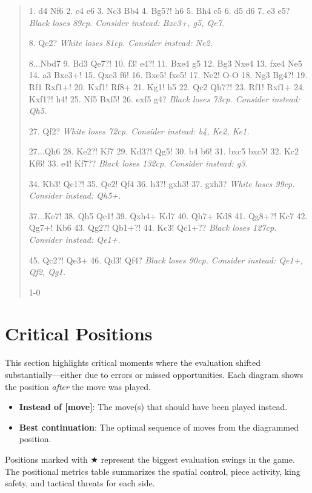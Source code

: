 \documentclass[11pt]{book}
\begin{document}
\begin{quote}
1. d4 Nf6
2. c4 e6
3. Nc3 Bb4
4. Bg5?! h6
5. Bh4 c5
6. d5 d6
7. e3 e5?
\textit{Black loses 89cp. Consider instead: Bxc3+, g5, Qe7.}

8. Qc2?
\textit{White loses 81cp. Consider instead: Ne2.}

8...Nbd7
9. Bd3 Qe7?!
10. f3! e4?!
11. Bxe4 g5
12. Bg3 Nxe4
13. fxe4 Ne5
14. a3 Bxc3+!
15. Qxc3 f6!
16. Bxe5! fxe5!
17. Ne2! O-O
18. Ng3 Bg4?!
19. Rf1 Rxf1+!
20. Kxf1! Rf8+
21. Kg1! h5
22. Qc2 Qh7?!
23. Rf1! Rxf1+
24. Kxf1?! h4!
25. Nf5 Bxf5!
26. exf5 g4?
\textit{Black loses 73cp. Consider instead: Qh5.}

27. Qf2?
\textit{White loses 72cp. Consider instead: b4, Ke2, Ke1.}

27...Qh6
28. Ke2?! Kf7
29. Kd3?! Qg5!
30. b4 b6!
31. bxc5 bxc5!
32. Kc2 Kf6!
33. e4! Kf7??
\textit{Black loses 132cp. Consider instead: g3.}

34. Kb3! Qc1?!
35. Qe2! Qf4
36. h3?! gxh3!
37. gxh3?
\textit{White loses 99cp. Consider instead: Qh5+.}

37...Ke7!
38. Qh5 Qc1!
39. Qxh4+ Kd7
40. Qh7+ Kd8
41. Qg8+?! Kc7
42. Qg7+! Kb6
43. Qg2?! Qb1+?!
44. Kc3! Qc1+??
\textit{Black loses 127cp. Consider instead: Qe1+.}

45. Qc2?! Qe3+
46. Qd3! Qf4?
\textit{Black loses 90cp. Consider instead: Qe1+, Qf2, Qg1.}


1-0
\end{quote}

\section{Critical Positions}

This section highlights critical moments where the evaluation shifted substantially---either due to errors or missed opportunities. Each diagram shows the position \emph{after} the move was played.

\begin{itemize}
\item \textbf{Instead of [move]}: The move(s) that should have been played instead.
\item \textbf{Best continuation}: The optimal sequence of moves from the diagrammed position.
\end{itemize}

Positions marked with {\color{blue}$\bigstar$} represent the biggest evaluation swings in the game. The positional metrics table summarizes the spatial control, piece activity, king safety, and tactical threats for each side.
\end{document}
